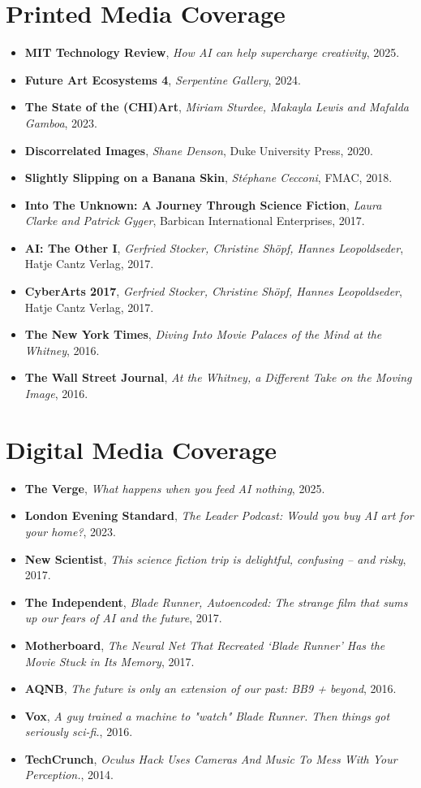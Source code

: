 \documentclass[letterpaper,11pt]{article}
\newcommand{\resumeItem}[2]{
  \item\small{
    \textbf{#1}{ #2 \vspace{-2pt}}
  }
}
\newcommand{\resumeSubItem}[2]{\resumeItem{#1}{#2}\vspace{-4pt}}
\newcommand{\resumeSubHeadingListStart}{\begin{itemize}[leftmargin=*]}
\newcommand{\resumeSubHeadingListEnd}{\end{itemize}}
\begin{document}
 \section{Printed Media Coverage}
 \resumeSubHeadingListStart
 \resumeSubItem{}{\textbf{MIT Technology Review}, \textit{How AI can help supercharge creativity}, 2025.}
 \resumeSubItem{}{\textbf{Future Art Ecosystems 4}, \textit{Serpentine Gallery}, 2024.}
 \resumeSubItem{}{\textbf{The State of the (CHI)Art}, \textit{Miriam Sturdee, Makayla Lewis and Mafalda Gamboa}, 2023.}
 \resumeSubItem{}{\textbf{Discorrelated Images}, \textit{Shane Denson}, Duke University Press, 2020.}
  \resumeSubItem{}{\textbf{Slightly Slipping on a Banana Skin}, \textit{St\'ephane Cecconi}, FMAC, 2018.}
 \resumeSubItem{}{\textbf{Into The Unknown: A Journey Through Science Fiction}, \textit{Laura Clarke and Patrick Gyger}, Barbican International Enterprises, 2017.}
 \resumeSubItem{}{\textbf{AI: The Other I}, \textit{Gerfried Stocker, Christine Sh\"{o}pf, Hannes Leopoldseder}, Hatje Cantz Verlag, 2017.}
 \resumeSubItem{}{\textbf{CyberArts 2017}, \textit{Gerfried Stocker, Christine Sh\"{o}pf, Hannes Leopoldseder}, Hatje Cantz Verlag, 2017.}
 \resumeSubItem{}{\textbf{The New York Times}, \textit{Diving Into Movie Palaces of the Mind at the Whitney}, 2016.}
 \resumeSubItem{}{\textbf{The Wall Street Journal}, \textit{At the Whitney, a Different Take on the Moving Image}, 2016.}
 \resumeSubHeadingListEnd


 \section{Digital Media Coverage}
 \resumeSubHeadingListStart
  \resumeSubItem{}{\textbf{The Verge}, \textit{What happens when you feed AI nothing}, 2025.}
  \resumeSubItem{}{\textbf{London Evening Standard}, \textit{The Leader Podcast: Would you buy AI art for your home?}, 2023.}
 \resumeSubItem{}{\textbf{New Scientist}, \textit{This science fiction trip is delightful, confusing – and risky}, 2017.}
 \resumeSubItem{}{\textbf{The Independent}, \textit{Blade Runner, Autoencoded: The strange film that sums up our fears of AI and the future}, 2017.}
  \resumeSubItem{}{\textbf{Motherboard}, \textit{The Neural Net That Recreated ‘Blade Runner’ Has the Movie Stuck in Its Memory}, 2017.}
 \resumeSubItem{}{\textbf{AQNB}, \textit{The future is only an extension of our past: BB9 + beyond}, 2016.}
 \resumeSubItem{}{\textbf{Vox}, \textit{A guy trained a machine to "watch" Blade Runner. Then things got seriously sci-fi.}, 2016.}
 \resumeSubItem{}{\textbf{TechCrunch}, \textit{Oculus Hack Uses Cameras And Music To Mess With Your Perception.}, 2014.}
 \resumeSubHeadingListEnd
\end{document}
